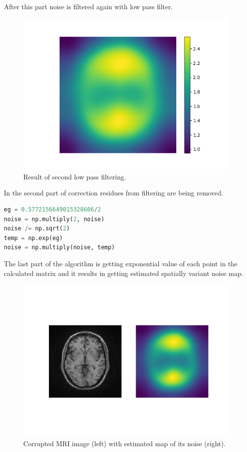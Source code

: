 After this part noise is filtered again with low pass filter.
\begin{figure}[H]
	\centering{}
		\includegraphics[scale=0.7]{figures/module03/70_lpf2}
	\caption{Result of second low pass filtering.} 
\end{figure}
In the second part of correction residues from filtering are being removed.
\begin{lstlisting}[language=Python, caption = Removing of residues from filtering.]
eg = 0.5772156649015328606/2
noise = np.multiply(2, noise)
noise /= np.sqrt(2)
temp = np.exp(eg)
noise = np.multiply(noise, temp)
\end{lstlisting}
The last part of the algorithm is getting exponential value of each point in the calculated matrix and it results in getting estimated spatially variant noise map.
\begin{figure}[H]
	\centering{}
		\includegraphics[scale=0.7]{figures/module03/70_zdjecie_mapa}
	\caption{Corrupted MRI image (left) with estimated map of its noise (right).} 
\end{figure}